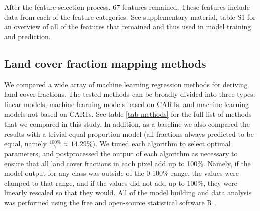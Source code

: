 \documentclass[review,authoryear,3p]{elsarticle}
\begin{document}
After the feature selection process, 67 features remained.
These features include data from each of the feature categories.
See supplementary material, table S1 for an overview of all of the features that remained and thus used in model training and prediction.

\subsection{Land cover fraction mapping methods}

We compared a wide array of machine learning regression methods for deriving land cover fractions.
The tested methods can be broadly divided into three types: linear models, machine learning models based on \glspl{CART}, and machine learning models not based on \glspl{CART}.
See table \ref{tab-methods} for the full list of methods that we compared in this study.
In addition, as a baseline we also compared the results with a trivial equal proportion model (all fractions always predicted to be equal, namely $\frac{100\%}{7}\approx14.29\%$).
We tuned each algorithm to select optimal parameters, and postprocessed the output of each algorithm as necessary to ensure that all land cover fractions in each pixel add up to 100\%.
Namely, if the model output for any class was outside of the 0-100\% range, the values were clamped to that range, and if the values did not add up to 100\%, they were linearly rescaled so that they would.
All of the model building and data analysis was performed using the free and open-source statistical software R \citep{r_2019}.
\end{document}
